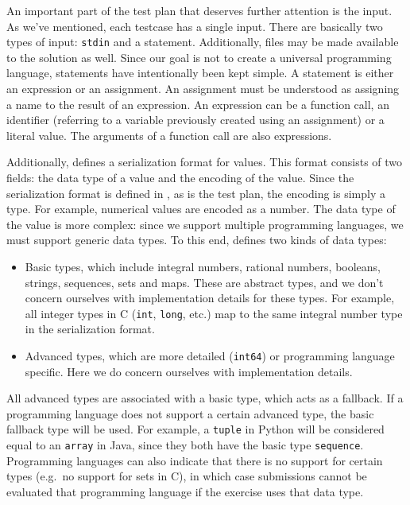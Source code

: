 \documentclass[5p,number]{elsarticle}
\begin{document}
    An important part of the test plan that deserves further attention is the input.
    As we've mentioned, each testcase has a single input.
    There are basically two types of input: \texttt{stdin} and a statement.
    Additionally, files may be made available to the solution as well.
    Since our goal is not to create a universal programming language, statements have intentionally been kept simple.
    A statement is either an expression or an assignment.
    An assignment must be understood as assigning a name to the result of an expression.
    An expression can be a function call, an identifier (referring to a variable previously created using an assignment) or a literal value.
    The arguments of a function call are also expressions.

    Additionally, \tested{} defines a serialization format for values.
    This format consists of two fields: the data type of a value and the encoding of the value.
    Since the serialization format is defined in , as is the test plan, the encoding is simply a  type.
    For example, numerical values are encoded as a  number.
    The data type of the value is more complex: since we support multiple programming languages, we must support generic data types.
    To this end, \tested{} defines two kinds of data types:

    \begin{itemize}
        \item Basic types, which include integral numbers, rational numbers, booleans, strings, sequences, sets and maps.
        These are abstract types, and we don't concern ourselves with implementation details for these types.
        For example, all integer types in C (\texttt{int}, \texttt{long}, etc.) map to the same integral number type in the serialization format.
        \item Advanced types, which are more detailed (\texttt{int64}) or programming language specific.
        Here we do concern ourselves with implementation details.
    \end{itemize}

    All advanced types are associated with a basic type, which acts as a fallback.
    If a programming language does not support a certain advanced type, the basic fallback type will be used.
    For example, a \texttt{tuple} in Python will be considered equal to an \texttt{array} in Java, since they both have the basic type \texttt{sequence}.
    Programming languages can also indicate that there is no support for certain types (e.g.\ no support for sets in C), in which case submissions cannot be evaluated that programming language if the exercise uses that data type.
    
\end{document}
